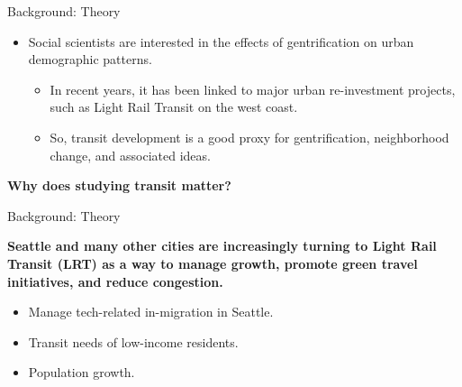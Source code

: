\documentclass[11pt,ignorenonframetext,]{beamer}
\providecommand{\tightlist}{%
  \setlength{\itemsep}{0pt}\setlength{\parskip}{0pt}}
\begin{document}
\begin{frame}{Background: Theory}
\protect\hypertarget{background-theory}{}

\begin{itemize}
\tightlist
\item
  Social scientists are interested in the effects of gentrification on
  urban demographic patterns.

  \begin{itemize}
  \tightlist
  \item
    In recent years, it has been linked to major urban re-investment
    projects, such as Light Rail Transit on the west coast.
  \item
    So, transit development is a good proxy for gentrification,
    neighborhood change, and associated ideas.
  \end{itemize}
\end{itemize}

\textbf{Why does studying transit matter?}

\end{frame}

\begin{frame}{Background: Theory}
\protect\hypertarget{background-theory-1}{}

\textbf{Seattle and many other cities are increasingly turning to Light
Rail Transit (LRT) as a way to manage growth, promote green travel
initiatives, and reduce congestion.}

\begin{itemize}
\tightlist
\item
  Manage tech-related in-migration in Seattle.
\item
  Transit needs of low-income residents.
\item
  Population growth.
\end{itemize}

\end{frame}
\end{document}
